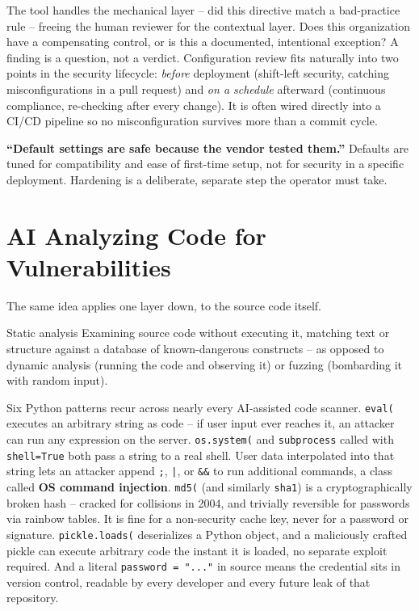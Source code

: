 The tool handles the mechanical layer -- did this directive match a bad-practice rule -- freeing
the human reviewer for the contextual layer. Does this organization have a compensating control,
or is this a documented, intentional exception? A finding is a question, not a verdict.
Configuration review fits naturally into two points in the security lifecycle: \emph{before}
deployment (shift-left security, catching misconfigurations in a pull request) and \emph{on a
schedule} afterward (continuous compliance, re-checking after every change). It is often wired
directly into a CI/CD pipeline so no misconfiguration survives more than a commit cycle.

\begin{misconception}
\textbf{``Default settings are safe because the vendor tested them.''} Defaults are tuned for
compatibility and ease of first-time setup, not for security in a specific deployment. Hardening
is a deliberate, separate step the operator must take.
\end{misconception}

\section{AI Analyzing Code for Vulnerabilities}

The same idea applies one layer down, to the source code itself.

\begin{definition}{Static analysis}
Examining source code without executing it, matching text or structure against a database of
known-dangerous constructs -- as opposed to dynamic analysis (running the code and observing it)
or fuzzing (bombarding it with random input).
\end{definition}

Six Python patterns recur across nearly every AI-assisted code scanner. \texttt{eval(} executes an
arbitrary string as code -- if user input ever reaches it, an attacker can run any expression on
the server. \texttt{os.system(} and \texttt{subprocess} called with \texttt{shell=True} both pass
a string to a real shell. User data interpolated into that string lets an attacker append
\texttt{;}, \texttt{|}, or \texttt{\&\&} to run additional commands, a class called
\textbf{OS command injection}. \texttt{md5(} (and similarly \texttt{sha1}) is a cryptographically
broken hash -- cracked for collisions in 2004, and trivially reversible for passwords via rainbow
tables. It is fine for a non-security cache key, never for a password or signature.
\texttt{pickle.loads(} deserializes a Python object, and a maliciously crafted pickle can execute
arbitrary code the instant it is loaded, no separate exploit required. And a literal
\texttt{password = "..."} in source means the credential sits in version control, readable by
every developer and every future leak of that repository.

